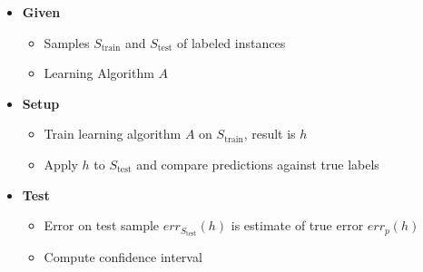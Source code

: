 \begin{itemize}
    \item \textbf{Given}
    \begin{itemize}
        \item Samples $S_{\text{train}}$ and $S_{\text{test}}$ of labeled instances
        \item Learning Algorithm $A$
    \end{itemize}
    \item \textbf{Setup}
    \begin{itemize}
        \item Train learning algorithm $A$ on $S_{\text{train}}$, result is $h$
        \item Apply $h$ to $S_{\text{test}}$ and compare predictions against true labels
    \end{itemize}
    \item \textbf{Test}
    \begin{itemize}
        \item Error on test sample $err_{S_{\text{test}}}(h)$ is estimate of true error $err_{p}(h)$
        \item Compute confidence interval
    \end{itemize}
\end{itemize}